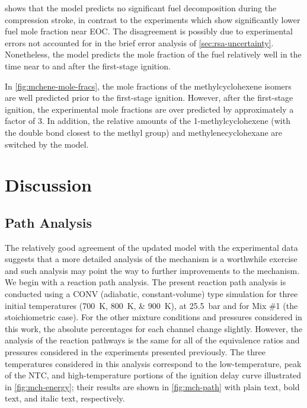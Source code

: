 \documentclass[../main.tex]{subfiles}
\begin{document}
 shows that the model predicts no significant
fuel decomposition during the compression stroke, in contrast to the
experiments which show significantly lower fuel mole fraction near EOC.
The disagreement is possibly due to experimental errors not accounted for
in the brief error analysis of \cref{sec:rsa-uncertainty}. Nonetheless,
the model predicts the mole fraction of the fuel relatively well in the
time near to and after the first-stage ignition.

In \cref{fig:mchene-mole-fracs}, the mole fractions of the methylcyclohexene
isomers are well predicted prior to the first-stage ignition. However,
after the first-stage ignition, the experimental mole fractions are
over predicted by approximately a factor of 3. In addition, the relative
amounts of the 1-methylcyclohexene (with the double bond closest to the
methyl group) and methylenecyclohexane are switched by the model.

\section{Discussion}
\label{sec:discussion}
\subsection{Path Analysis}
\label{sec:mch-path-analysis}

The relatively good agreement of the updated model with the experimental data
suggests that a more detailed analysis of the mechanism is a worthwhile
exercise and such analysis may point the way to further improvements to the
mechanism. We begin with a reaction path analysis. The present reaction path
analysis is conducted using a CONV (adiabatic, constant-volume) type simulation
for three initial temperatures (\SIlist{700;800;900}{\kelvin}), at \SI{25.5}{\bar} and for
Mix \#1 (the stoichiometric case). For the other mixture conditions and
pressures considered in this work, the absolute percentages for each channel
change slightly. However, the analysis of the reaction pathways is the same for
all of the equivalence ratios and pressures considered in the experiments
presented previously. The three temperatures considered in this analysis
correspond to the low-temperature, peak of the NTC, and high-temperature
portions of the ignition delay curve illustrated in \cref{fig:mch-energy};
their results are shown in \cref{fig:mch-path} with plain text, bold text,
and italic text, respectively.
\end{document}
